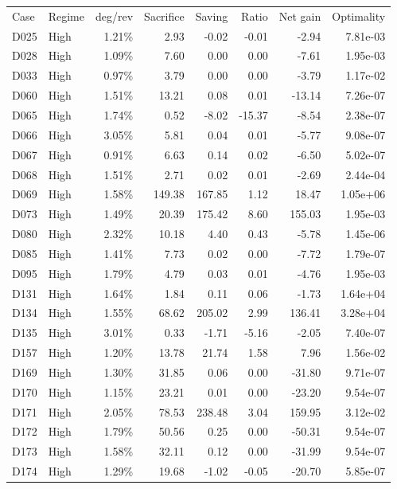 \begin{tabular}{l l r r r r r r}
\hline\noalign{\smallskip}
Case & Regime & deg/rev & Sacrifice & Saving & Ratio & Net gain & Optimality \\
\noalign{\smallskip}\hline\noalign{\smallskip}
D025 & High & 1.21\% & 2.93 & -0.02 & -0.01 & -2.94 & 7.81e-03 \\
D028 & High & 1.09\% & 7.60 & 0.00 & 0.00 & -7.61 & 1.95e-03 \\
D033 & High & 0.97\% & 3.79 & 0.00 & 0.00 & -3.79 & 1.17e-02 \\
D060 & High & 1.51\% & 13.21 & 0.08 & 0.01 & -13.14 & 7.26e-07 \\
D065 & High & 1.74\% & 0.52 & -8.02 & -15.37 & -8.54 & 2.38e-07 \\
D066 & High & 3.05\% & 5.81 & 0.04 & 0.01 & -5.77 & 9.08e-07 \\
D067 & High & 0.91\% & 6.63 & 0.14 & 0.02 & -6.50 & 5.02e-07 \\
D068 & High & 1.51\% & 2.71 & 0.02 & 0.01 & -2.69 & 2.44e-04 \\
D069 & High & 1.58\% & 149.38 & 167.85 & 1.12 & 18.47 & 1.05e+06 \\
D073 & High & 1.49\% & 20.39 & 175.42 & 8.60 & 155.03 & 1.95e-03 \\
D080 & High & 2.32\% & 10.18 & 4.40 & 0.43 & -5.78 & 1.45e-06 \\
D085 & High & 1.41\% & 7.73 & 0.02 & 0.00 & -7.72 & 1.79e-07 \\
D095 & High & 1.79\% & 4.79 & 0.03 & 0.01 & -4.76 & 1.95e-03 \\
D131 & High & 1.64\% & 1.84 & 0.11 & 0.06 & -1.73 & 1.64e+04 \\
D134 & High & 1.55\% & 68.62 & 205.02 & 2.99 & 136.41 & 3.28e+04 \\
D135 & High & 3.01\% & 0.33 & -1.71 & -5.16 & -2.05 & 7.40e-07 \\
D157 & High & 1.20\% & 13.78 & 21.74 & 1.58 & 7.96 & 1.56e-02 \\
D169 & High & 1.30\% & 31.85 & 0.06 & 0.00 & -31.80 & 9.71e-07 \\
D170 & High & 1.15\% & 23.21 & 0.01 & 0.00 & -23.20 & 9.54e-07 \\
D171 & High & 2.05\% & 78.53 & 238.48 & 3.04 & 159.95 & 3.12e-02 \\
D172 & High & 1.79\% & 50.56 & 0.25 & 0.00 & -50.31 & 9.54e-07 \\
D173 & High & 1.58\% & 32.11 & 0.12 & 0.00 & -31.99 & 9.54e-07 \\
D174 & High & 1.29\% & 19.68 & -1.02 & -0.05 & -20.70 & 5.85e-07 \\

\end{tabular}
